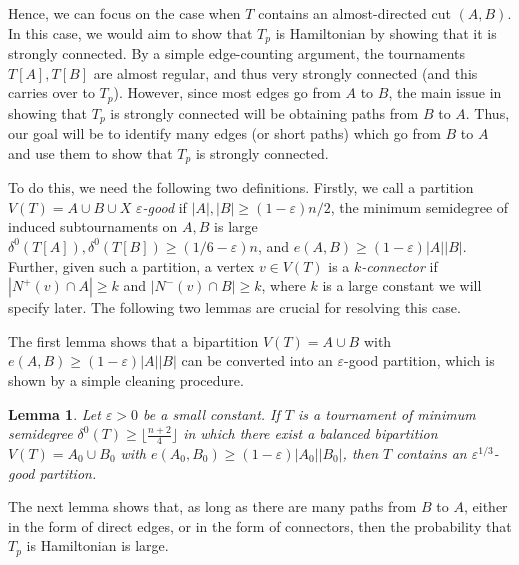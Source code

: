 \documentclass[a4paper,11pt]{article}
\newtheorem{lemma}[theorem]{\bf Lemma}
\theoremstyle{definition}
\def\eps{\varepsilon}
\begin{document}
Hence, we can focus on the case when $T$ contains an almost-directed cut $(A, B)$. In this case, we would aim to show that $T_p$ is Hamiltonian by showing that it is strongly connected. By a simple edge-counting argument, the tournaments $T[A], T[B]$ are almost regular, and thus very strongly connected (and this carries over to $T_p$). However, since most edges go from $A$ to $B$, the main issue in showing that $T_p$ is strongly connected will be obtaining paths from $B$ to $A$. Thus, our goal will be to identify many edges (or short paths) which go from $B$ to $A$ and use them to show that $T_p$ is strongly connected.

To do this, we need the following two definitions. Firstly, we call a partition $V(T)=A\cup B\cup X$ \textit{$\eps$-good} if $|A|, |B|\geq (1-\eps)n/2$, the minimum semidegree of induced subtournaments on $A, B$ is large $\delta^0(T[A]), \delta^0(T[B])\geq (1/6-\eps)n$, and $e(A, B)\geq (1-\eps) |A||B|$. Further, given such a partition, a vertex $v\in V(T)$ is a \textit{$k$-connector} if $|N^+(v)\cap A|\geq k$ and $|N^-(v)\cap B|\geq k$, where $k$ is a large constant we will specify later. The following two lemmas are crucial for resolving this case.

The first lemma shows that a bipartition $V(T)=A\cup B$ with $e(A, B)\geq (1-\eps) |A||B|$ can be converted into an $\eps$-good partition, which is shown by a simple cleaning procedure.

\begin{lemma}\label{lemma:good partitions exist}
Let $\eps>0$ be a small constant. If $T$ is a tournament of minimum semidegree $\delta^0(T)\geq \lfloor \frac{n+2}{4}\rfloor$ in which there exist a balanced bipartition $V(T)=A_0\cup B_0$ with $e(A_0, B_0)\geq (1-\eps)|A_0||B_0|$, then $T$ contains an $\eps^{1/3}$-good partition.
\end{lemma}

The next lemma shows that, as long as there are many paths from $B$ to $A$, either in the form of direct edges, or in the form of connectors, then the probability that $T_p$ is Hamiltonian is large.
\end{document}
